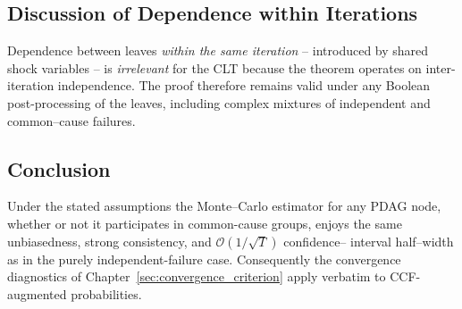 \subsection{Discussion of Dependence within Iterations}
Dependence between leaves \emph{within the same iteration} – introduced by
shared shock variables – is \emph{irrelevant} for the CLT because the theorem
operates on inter-iteration independence.  The proof therefore remains valid
under any Boolean post-processing of the leaves, including complex mixtures of
independent and common–cause failures.

\subsection{Conclusion}
Under the stated assumptions the Monte–Carlo estimator for any PDAG node,
whether or not it participates in common-cause groups, enjoys the same
unbiasedness, strong consistency, and $\mathcal{O}(1/\sqrt{T})$ confidence–
interval half–width as in the purely independent-failure case.  Consequently
the convergence diagnostics of Chapter~\ref{sec:convergence_criterion} apply
verbatim to CCF-augmented probabilities.
